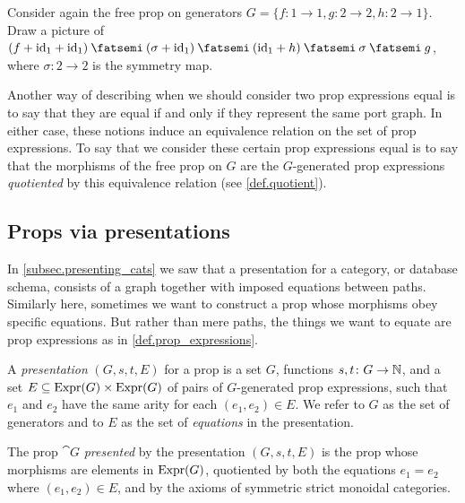 \documentclass[7Sketches]{subfiles}
\begin{document}
\begin{exercise}%
\label{exc.free_prop_pic}
Consider again the free prop on generators $G=\{f\colon 1 \to 1, g\colon 2 \to
2, h\colon 2 \to 1\}$. Draw a picture of
$(f+\id_1+\id_1)\cp(\sigma+\id_1)\cp(\id_1+h)\cp \sigma\cp g$, where
$\sigma\colon 2\to 2$ is the symmetry map.
\end{exercise}

Another way of describing when we should consider two prop expressions equal is
to say that they are equal if and only if they represent the same port graph. In
either case, these notions induce an equivalence relation on the set of prop
expressions. To say that we consider these certain prop expressions equal is to
say that the morphisms of the free prop on $G$ are the $G$-generated prop
expressions \emph{quotiented} by this equivalence relation (see
\cref{def.quotient}).

\subsection{Props via presentations}
\label{sec.prop_presentations}

In \cref{subsec.presenting_cats} we saw that a presentation for a category, or
database schema, consists of a graph together with imposed equations between
paths. Similarly here, sometimes we want to construct a prop whose morphisms
obey specific equations. But rather than mere paths, the things we want to
equate are prop expressions as in \cref{def.prop_expressions}.%

\begin{roughDef}%
\label{rdef.presentation_prop}%
%
A \emph{presentation} $(G,s,t,E)$ for a prop is a set $G$, functions $s,t\colon G\to\mathbb{N}$, and a set $E\subseteq \mathrm{Expr}(G) \times \mathrm{Expr}(G)$ of pairs of $G$-generated prop expressions, such that $e_1$ and $e_2$ have the same arity for each $(e_1,e_2)\in E$. We refer to $G$ as the set of generators and to $E$ as the set of \emph{equations} in the presentation.%
%

The prop $\cat{G}$ \emph{presented} by the presentation $(G,s,t,E)$ is the prop whose
morphisms are elements in $\mathrm{Expr}(G)$, quotiented by both the equations
$e_1=e_2$ where $(e_1,e_2) \in E$, and by the axioms of symmetric strict monoidal categories.
\end{roughDef}
\end{document}
